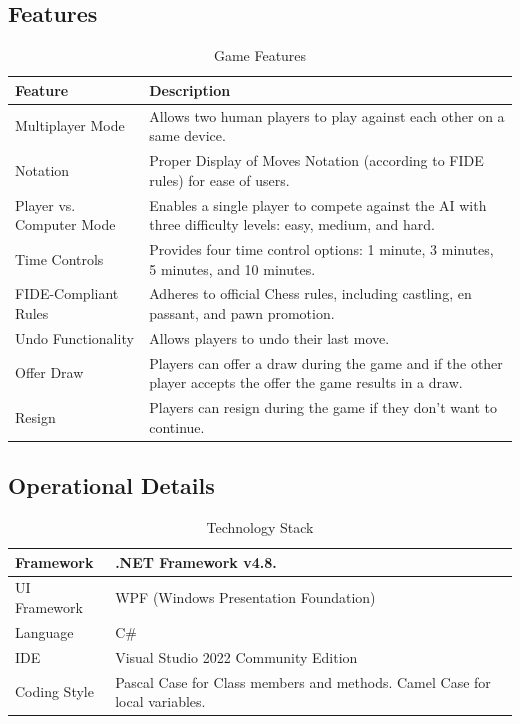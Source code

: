 \documentclass[a4paper,12pt]{article}
\begin{document}
\subsection{Features}
\begin{longtable}{|p{}|p{}|}
    \caption{Game Features}
    \hline
    \textbf{Feature} & \textbf{Description} \\
    \hline
    Multiplayer Mode & Allows two human players to play against each other on a same device. \\
    \hline
    Notation & Proper Display of Moves Notation (according to FIDE rules) for ease of users. \\
    \hline
    Player vs. Computer Mode & Enables a single player to compete against the AI with three difficulty levels: easy, medium, and hard. \\
    \hline
    Time Controls & Provides four time control options: 1 minute, 3 minutes, 5 minutes, and 10 minutes. \\
    \hline
    FIDE-Compliant Rules & Adheres to official Chess rules, including castling, en passant, and pawn promotion. \\
    \hline
    Undo Functionality & Allows players to undo their last move. \\
    \hline
    Offer Draw & Players can offer a draw during the game and if the other player accepts the offer the game results in a draw. \\
    \hline
    Resign & Players can resign during the game if they don't want to continue. \\
    \hline
\end{longtable}

\subsection{Operational Details}
\begin{longtable}{|p{}|p{}|}
    \caption{Technology Stack}
    \hline
    Framework & .NET Framework v4.8. \\
    \hline
    UI Framework & WPF (Windows Presentation Foundation)   \\
    \hline
    Language & C\# \\
    \hline
    IDE & Visual Studio 2022 Community Edition \\
    \hline
    Coding Style & Pascal Case for Class members and methods. Camel Case for local variables. \\
    \hline
\end{longtable}
\end{document}
